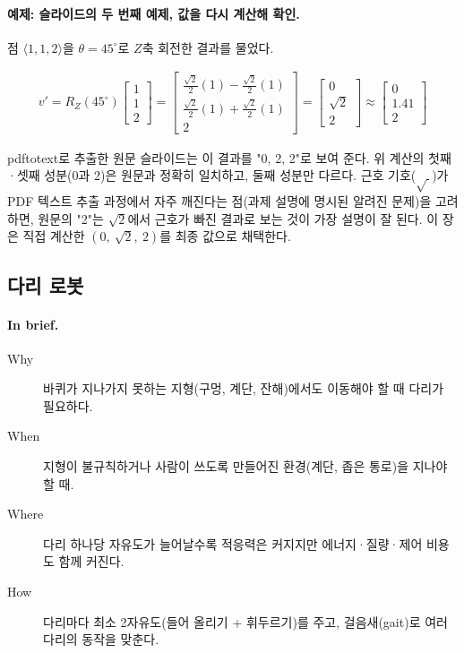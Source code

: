 \paragraph{예제: 슬라이드의 두 번째 예제, 값을 다시 계산해 확인.}
점 $\langle 1, 1, 2\rangle$을 $\theta = 45^\circ$로 $Z$축 회전한 결과를 물었다.

\begin{align*}
v' = R_Z(45^\circ)\begin{bmatrix}1\\1\\2\end{bmatrix}
   = \begin{bmatrix}
       \tfrac{\sqrt2}{2}(1) - \tfrac{\sqrt2}{2}(1) \\
       \tfrac{\sqrt2}{2}(1) + \tfrac{\sqrt2}{2}(1) \\
       2
     \end{bmatrix}
   = \begin{bmatrix} 0 \\ \sqrt2 \\ 2 \end{bmatrix}
   \approx \begin{bmatrix} 0 \\ 1.41 \\ 2 \end{bmatrix}
\end{align*}

pdftotext로 추출한 원문 슬라이드는 이 결과를 "0, 2, 2"로 보여 준다. 위 계산의
첫째·셋째 성분(0과 2)은 원문과 정확히 일치하고, 둘째 성분만 다르다. 근호
기호($\sqrt{\ }$)가 PDF 텍스트 추출 과정에서 자주 깨진다는 점(과제 설명에 명시된
알려진 문제)을 고려하면, 원문의 "2"는 $\sqrt{2}$에서 근호가 빠진 결과로 보는
것이 가장 설명이 잘 된다. 이 장은 직접 계산한 $(0,\ \sqrt2,\ 2)$를 최종 값으로
채택한다.

\subsection{다리 로봇}
\label{sec:lec02-walking-robots}

\paragraph{In brief.}
\begin{description}
  \item[Why] 바퀴가 지나가지 못하는 지형(구멍, 계단, 잔해)에서도 이동해야 할 때
        다리가 필요하다.
  \item[When] 지형이 불규칙하거나 사람이 쓰도록 만들어진 환경(계단, 좁은 통로)을
        지나야 할 때.
  \item[Where] 다리 하나당 자유도가 늘어날수록 적응력은 커지지만 에너지·질량·제어
        비용도 함께 커진다.
  \item[How] 다리마다 최소 2자유도(들어 올리기 + 휘두르기)를 주고, 걸음새(gait)로
        여러 다리의 동작을 맞춘다.
\end{description}

